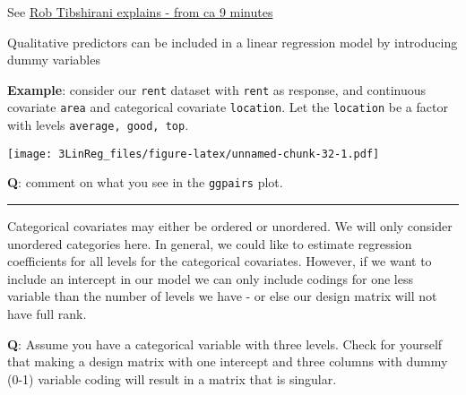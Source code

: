 \documentclass[]{article}
\newenvironment{Shaded}{\begin{snugshade}}{\end{snugshade}}
\newcommand{\CommentTok}[1]{\textcolor[rgb]{0.56,0.35,0.01}{\textit{#1}}}
\newcommand{\KeywordTok}[1]{\textcolor[rgb]{0.13,0.29,0.53}{\textbf{#1}}}
\newcommand{\NormalTok}[1]{#1}
\newcommand{\OperatorTok}[1]{\textcolor[rgb]{0.81,0.36,0.00}{\textbf{#1}}}
\newcommand{\StringTok}[1]{\textcolor[rgb]{0.31,0.60,0.02}{#1}}
\begin{document}
See
\href{https://www.youtube.com/watch?v=3T6RXmIHbJ4\&index=4\&list=PL5-da3qGB5IBSSCPANhTgrw82ws7w_or9}{Rob
Tibshirani explains - from ca 9 minutes}

Qualitative predictors can be included in a linear regression model by
introducing dummy variables

\textbf{Example}: consider our \texttt{rent} dataset with \texttt{rent}
as response, and continuous covariate \texttt{area} and categorical
covariate \texttt{location}. Let the \texttt{location} be a factor with
levels \texttt{average,\ good,\ top}.

\footnotesize

\begin{Shaded}
\end{Shaded}

\texttt{[image: 3LinReg\_files/figure-latex/unnamed-chunk-32-1.pdf]}
\normalsize

\textbf{Q}: comment on what you see in the \texttt{ggpairs} plot.

\begin{center}\rule{0.5\linewidth}{\linethickness}\end{center}

Categorical covariates may either be ordered or unordered. We will only
consider unordered categories here. In general, we could like to
estimate regression coefficients for all levels for the categorical
covariates. However, if we want to include an intercept in our model we
can only include codings for one less variable than the number of levels
we have - or else our design matrix will not have full rank.

\textbf{Q}: Assume you have a categorical variable with three levels.
Check for yourself that making a design matrix with one intercept and
three columns with dummy (0-1) variable coding will result in a matrix
that is singular.
\end{document}
